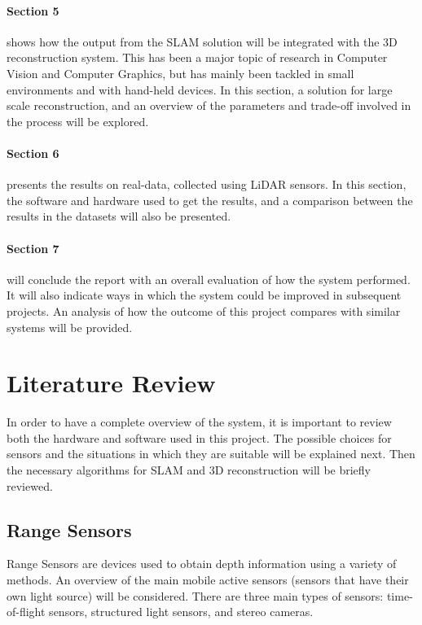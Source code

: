 \documentclass[11pt]{article}
\begin{document}
\paragraph{Section 5} shows how the output from the SLAM solution will be integrated with the 3D reconstruction system. This has been a major topic of research in Computer Vision and Computer Graphics, but has mainly been tackled in small environments and with hand-held devices. In this section, a solution for large scale reconstruction, and an overview of the parameters and trade-off involved in the process will be explored.
		
\paragraph{Section 6} presents the results on real-data, collected using LiDAR sensors. In this section, the software and hardware used to get the results, and a comparison between the results in the datasets will also be presented.
		
\paragraph{Section 7} will conclude the report with an overall evaluation of how the system performed. It will also indicate ways in which the system could be improved in subsequent projects. An analysis of how the outcome of this project compares with similar systems will be provided.

	\newpage
	\section{Literature Review}

In order to have a complete overview of the system, it is important to review both the hardware and software used in this project. The possible choices for sensors and the situations in which they are suitable will be explained next. Then the necessary algorithms for SLAM and 3D reconstruction will be briefly reviewed.

	\subsection{Range Sensors}
	\label{subs:RangeSensors}
	
Range Sensors are devices used to obtain depth information using a variety of methods. An overview of the main mobile active sensors (sensors that have their own light source) will be considered. There are three main types of sensors: time-of-flight sensors, structured light sensors, and stereo cameras.
\end{document}
